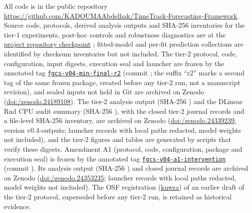 \documentclass[5p,twocolumn]{elsarticle}
\begin{document}
All code is in the public repository \url{https://github.com/KADOUMAAbdelhak/TimeTrack-Forecasting-Framework}.
Source code, protocols, derived analysis outputs and SHA-256 inventories for
the tier-1 experiments, post-hoc controls and robustness diagnostics are at
the
\href{https://github.com/KADOUMAAbdelhak/TimeTrack-Forecasting-Framework/tree/0e8cad884896a706f62f0fae4ab2b52812f9b033}{project repository checkpoint}
\texttt{}; fitted-model and
per-fit prediction collections are identified by checksum inventories but not
included. The tier-2 protocol, code, configuration, input digests, execution
seal and launcher are frozen by the annotated tag
\href{https://github.com/KADOUMAAbdelhak/TimeTrack-Forecasting-Framework/tree/fgcs-v04-min-final-r2}{\texttt{fgcs-v04-min-final-r2}}
(commit \texttt{}; the suffix
``r2'' marks a second tag of the same frozen package, created before any tier-2
run, not a manuscript revision), and sealed inputs not held in Git are archived on Zenodo
(\href{https://doi.org/10.5281/zenodo.24189108}{doi:/\allowbreak zenodo.24189108}).
The tier-2 analysis output (SHA-256
\texttt{})
and the DLinear Rnd CPU audit summary (SHA-256
\texttt{}),
with the closed tier-2 journal records and a file-level SHA-256 inventory, are
archived on Zenodo
(\href{https://doi.org/10.5281/zenodo.24339239}{doi:/\allowbreak zenodo.24339239},
version v0.4-outputs; launcher records with local paths redacted, model
weights not included), and the tier-2 figures and tables are generated by
scripts that verify these digests. Amendment A1 (protocol, code,
configuration, package and execution seal) is frozen by the annotated tag
\href{https://github.com/KADOUMAAbdelhak/TimeTrack-Forecasting-Framework/tree/fgcs-v04-a1-intervention}{\texttt{fgcs-v04-a1-intervention}}
(commit \texttt{}). Its
analysis output (SHA-256
\texttt{})
and closed journal records are archived on Zenodo
(\href{https://doi.org/10.5281/zenodo.24353235}{doi:/\allowbreak zenodo.24353235};
launcher records with local paths redacted, model weights not included).
The OSF registration (\href{https://osf.io/kuwra}{kuwra}) of an earlier draft
of the tier-2 protocol, superseded before any tier-2 run, is retained as
historical evidence.
\end{document}
